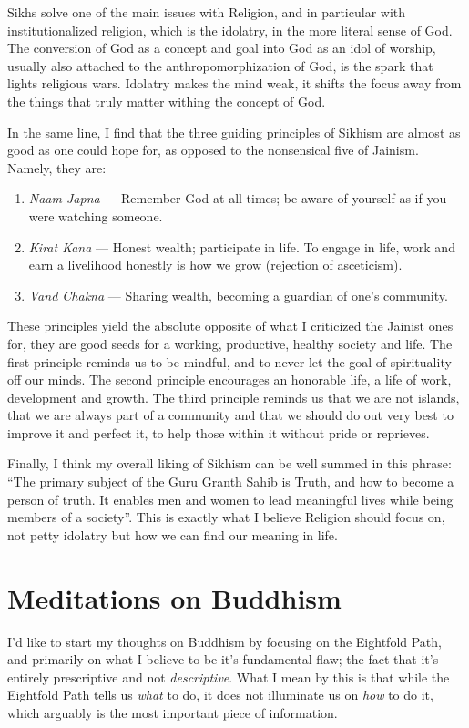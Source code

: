 \documentclass[12pt,letterpaper]{article}
\begin{document}
\begin{spacing}{2}
    Sikhs solve one of the main issues with Religion, and in particular with
    institutionalized religion, which is the idolatry, in the more literal sense
    of God. The conversion of God as a concept and goal into God as an idol of
    worship, usually also attached to the anthropomorphization of God, is the
    spark that lights religious wars. Idolatry makes the mind weak, it shifts
    the focus away from the things that truly matter withing the concept of God.

    In the same line, I find that the three guiding principles of Sikhism are
    almost as good as one could hope for, as opposed to the nonsensical five of
    Jainism. Namely, they are:
    \begin{enumerate}
        \item \emph{Naam Japna} --- Remember God at all times; be aware of
            yourself as if you were watching someone.
        \item \emph{Kirat Kana} --- Honest wealth; participate in life. To
            engage in life, work and earn a livelihood honestly is how we grow
            (rejection of asceticism).
        \item \emph{Vand Chakna} --- Sharing wealth, becoming a guardian of
            one's community.
    \end{enumerate}
    These principles yield the absolute opposite of what I criticized the
    Jainist ones for, they are good seeds for a working, productive, healthy
    society and life. The first principle reminds us to be mindful, and to never
    let the goal of spirituality off our minds. The second principle encourages
    an honorable life, a life of work, development and growth. The third
    principle reminds us that we are not islands, that we are always part of a
    community and that we should do out very best to improve it and perfect it,
    to help those within it without pride or reprieves.

    Finally, I think my overall liking of Sikhism can be well summed in this
    phrase: ``The primary subject of the Guru Granth Sahib is Truth, and how to
    become a person of truth. It enables men and women to lead meaningful lives
    while being members of a society''. This is exactly what I believe Religion
    should focus on, not petty idolatry but how we can find our meaning in life.

    \newpage
    \section{Meditations on Buddhism}
    I'd like to start my thoughts on Buddhism by focusing on the Eightfold Path,
    and primarily on what I believe to be it's fundamental flaw; the fact that
    it's entirely prescriptive and not \emph{descriptive}. What I mean by this
    is that while the Eightfold Path tells us \emph{what} to do, it does not
    illuminate us on \emph{how} to do it, which arguably is the most important
    piece of information.


\end{spacing}
\end{document}
